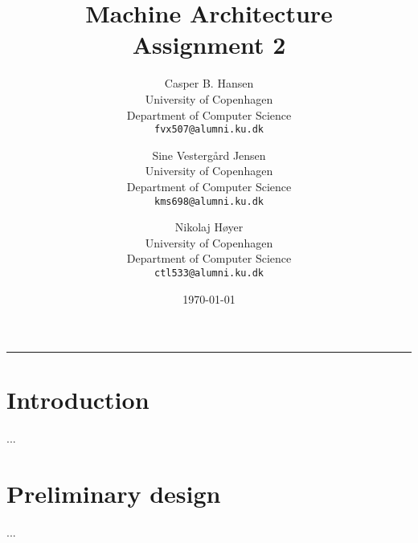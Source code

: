 \documentclass[11pt,twoside,a4paper]{article}
\title
{
	\vspace{0.0in}	%
	Machine Architecture\\
	\Large Assignment 2
}
\author
{
	Casper B. Hansen\\
	University of Copenhagen\\
	Department of Computer Science\\
	{\tt fvx507@alumni.ku.dk}
	\and
	Sine Vestergård Jensen\\
	University of Copenhagen\\
	Department of Computer Science\\
	{\tt kms698@alumni.ku.dk}
	\and
	Nikolaj Høyer\\
	University of Copenhagen\\
	Department of Computer Science\\
	{\tt ctl533@alumni.ku.dk}
}
\date{\today}
\begin{document}
\clearpage
\maketitle
\thispagestyle{empty}
\hrule
\vspace{0.5in}	%
\begin{multicols}{2}
\begin{abstract}
\lipsum[1]	%
\end{abstract}
\vfill
\columnbreak
\tableofcontents
\end{multicols}

\newpage
\pagestyle{fancy}
\section{Introduction}
...

\newpage
\pagestyle{fancy}
\section{Preliminary design}
...
\end{document}
